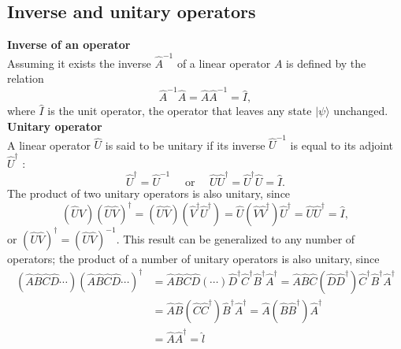 \subsection{Inverse and unitary operators}
\textbf{Inverse of an operator}\\
 Assuming it exists the inverse $\hat{A}^{-1}$ of a linear operator $A$ is defined by the relation
$$
\hat{A}^{-1} \hat{A}=\hat{A} \hat{A}^{-1}=\hat{I},
$$
where $\hat{I}$ is the unit operator, the operator that leaves any state $|\psi\rangle$ unchanged.\\
\textbf{Unitary operator}\\
 A linear operator $\hat{U}$ is said to be unitary if its inverse $\hat{U}^{-1}$ is equal to its adjoint $\hat{U}^{\dagger}$ :
$$
\hat{U}^{\dagger}=\hat{U}^{-1} \quad \text { or } \quad \hat{U} \hat{U}^{\dagger}=\hat{U}^{\dagger} \hat{U}=\hat{I} .
$$
The product of two unitary operators is also unitary, since
$$
(\hat{U} \hat{V})(\hat{U} \hat{V})^{\dagger}=(\hat{U} \hat{V})\left(\hat{V}^{\dagger} \hat{U}^{\dagger}\right)=\hat{U}\left(\hat{V} \hat{V}^{\dagger}\right) \hat{U}^{\dagger}=\hat{U} \hat{U}^{\dagger}=\hat{I},
$$
or $(\hat{U} \hat{V})^{\dagger}=(\hat{U} \hat{V})^{-1}$. This result can be generalized to any number of operators; the product of a number of unitary operators is also unitary, since
$$
\begin{aligned}
(\hat{A} \hat{B} \hat{C} \hat{D} \cdots)(\hat{A} \hat{B} \hat{C} \hat{D} \cdots)^{\dagger} &=\hat{A} \hat{B} \hat{C} \hat{D}(\cdots) \hat{D}^{\dagger} \hat{C}^{\dagger} \hat{B}^{\dagger} \hat{A}^{\dagger}=\hat{A} \hat{B} \hat{C}\left(\hat{D} \hat{D}^{\dagger}\right) \hat{C}^{\dagger} \hat{B}^{\dagger} \hat{A}^{\dagger} \\
&=\hat{A} \hat{B}\left(\hat{C} \hat{C}^{\dagger}\right) \hat{B}^{\dagger} \hat{A}^{\dagger}=\hat{A}\left(\hat{B} \hat{B}^{\dagger}\right) \hat{A}^{\dagger} \\
&=\hat{A} \hat{A}^{\dagger}=\hat{l}
\end{aligned}
$$

